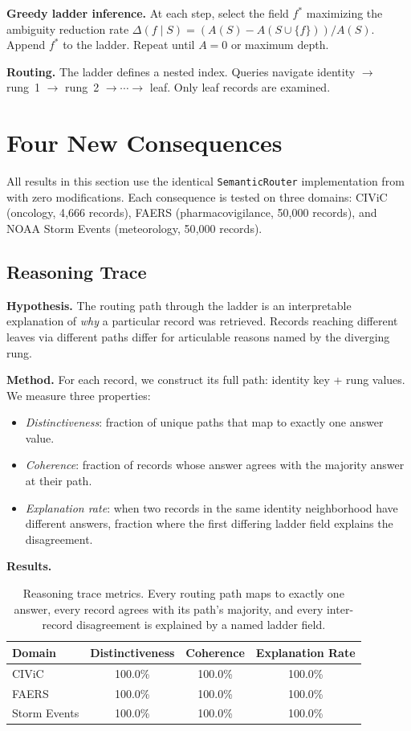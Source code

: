 \documentclass[11pt]{article}
\begin{document}
\textbf{Greedy ladder inference.} At each step, select the field $f^*$ maximizing the ambiguity reduction rate $\Delta(f \mid S) = (A(S) - A(S \cup \{f\})) / A(S)$. Append $f^*$ to the ladder. Repeat until $A = 0$ or maximum depth.

\textbf{Routing.} The ladder defines a nested index. Queries navigate identity $\to$ rung~1 $\to$ rung~2 $\to \cdots \to$ leaf. Only leaf records are examined.

\section{Four New Consequences}

All results in this section use the identical \texttt{SemanticRouter} implementation from~\cite{elms2026dw} with zero modifications. Each consequence is tested on three domains: CIViC (oncology, 4{,}666 records), FAERS (pharmacovigilance, 50{,}000 records), and NOAA Storm Events (meteorology, 50{,}000 records).

\subsection{Reasoning Trace}

\textbf{Hypothesis.} The routing path through the ladder is an interpretable explanation of \textit{why} a particular record was retrieved. Records reaching different leaves via different paths differ for articulable reasons named by the diverging rung.

\textbf{Method.} For each record, we construct its full path: identity key + rung values. We measure three properties:
\begin{itemize}
    \item \textit{Distinctiveness}: fraction of unique paths that map to exactly one answer value.
    \item \textit{Coherence}: fraction of records whose answer agrees with the majority answer at their path.
    \item \textit{Explanation rate}: when two records in the same identity neighborhood have different answers, fraction where the first differing ladder field explains the disagreement.
\end{itemize}

\textbf{Results.}

\begin{table}[h]
\centering
\begin{tabular}{lccc}
\toprule
Domain & Distinctiveness & Coherence & Explanation Rate \\
\midrule
CIViC & 100.0\% & 100.0\% & 100.0\% \\
FAERS & 100.0\% & 100.0\% & 100.0\% \\
Storm Events & 100.0\% & 100.0\% & 100.0\% \\
\bottomrule
\end{tabular}
\caption{Reasoning trace metrics. Every routing path maps to exactly one answer, every record agrees with its path's majority, and every inter-record disagreement is explained by a named ladder field.}
\label{tab:reasoning}
\end{table}
\end{document}
